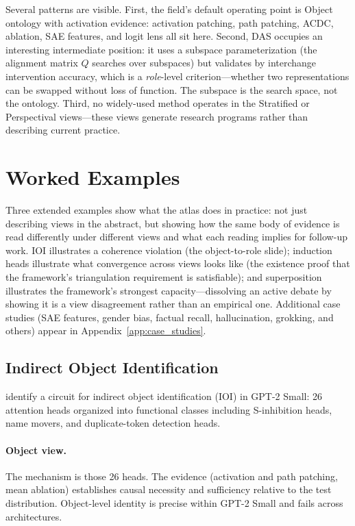 \documentclass{article}
\begin{document}
Several patterns are visible.  First, the field's default operating point
is Object ontology with activation evidence: activation patching, path
patching, ACDC, ablation, SAE features, and logit lens all sit here.
Second, DAS occupies an interesting intermediate position: it uses a
subspace parameterization (the alignment matrix $Q$ searches over
subspaces) but validates by interchange intervention accuracy, which is a
\emph{role}-level criterion---whether two representations can be swapped
without loss of function.  The subspace is the search space, not the
ontology.  Third, no widely-used method operates in the Stratified or
Perspectival views---these views generate research programs rather than
describing current practice.

\section{Worked Examples}\label{sec:examples}

Three extended examples show what the atlas does in practice: not just
describing views in the abstract, but showing how the same body of
evidence is read differently under different views and what each reading
implies for follow-up work.  IOI illustrates a coherence violation
(the object-to-role slide); induction heads illustrate what convergence
across views looks like (the existence proof that the framework's
triangulation requirement is satisfiable); and superposition illustrates
the framework's strongest capacity---dissolving an active debate by
showing it is a view disagreement rather than an empirical one.
Additional case studies (SAE features, gender bias, factual recall,
hallucination, grokking, and others) appear in
Appendix~\ref{app:case_studies}.

\subsection{Indirect Object Identification}

\citet{wang2022} identify a circuit for indirect object identification
(IOI) in GPT-2 Small: 26 attention heads organized into functional
classes including S-inhibition heads, name movers, and
duplicate-token detection heads.

\paragraph{Object view.}
The mechanism is those 26 heads.  The evidence (activation and path
patching, mean ablation) establishes causal necessity and sufficiency
relative to the test distribution.  Object-level identity is precise
within GPT-2 Small and fails across architectures.
\end{document}
